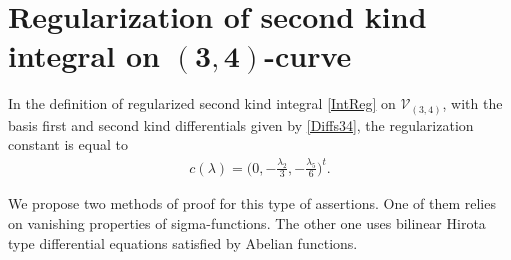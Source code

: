\section[Regularization of second kind integral on $(3,4)$-curve]{Regularization of second kind integral on $\boldsymbol{(3,4)}$-curve}\label{s:Reg34}
\begin{Theorem}\label{T:Reg34}
In the definition of regularized second kind integral \eqref{IntReg} on $\mathcal{V}_{(3,4)}$, with the basis first and second kind differentials given by \eqref{Diffs34}, the regularization constant is equal to
 \begin{gather}\label{C34const}
 c(\lambda) = \bigg(0, -\frac{\lambda_2}{3}, {-}\frac{\lambda_5}{6} \bigg)^t.
\end{gather}
\end{Theorem}
We propose two methods of proof for this type of assertions. One of them relies on vanishing properties of sigma-functions. The other one uses bilinear Hirota type differential equations satisfied by Abelian functions.
